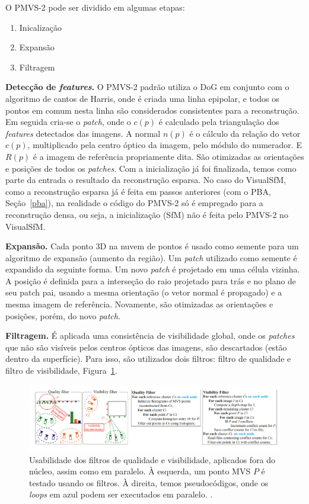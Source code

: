 O PMVS-2 pode ser dividido em algumas etapas:
\begin{enumerate}
\item{Inicalização}
\item{Expansão}
\item{Filtragem}
\end{enumerate}

\noindent\textbf{Detecção de \emph{features}.}
O PMVS-2 padrão utiliza o DoG em conjunto com o algoritmo de cantos de Harris,
onde é criada uma linha epipolar, e todos os pontos em comum nesta linha são
considerados consistentes para a reconstrução.  Em seguida cria-se o
\emph{patch},
onde o $c(p)$ é calculado pela triangulação dos \emph{features} detectados das
imagens. A normal $n(p)$ é o cálculo da relação do vetor $c(p)$, multiplicado
pela centro óptico da imagem, pelo módulo do numerador. E $R(p)$ é a imagem de
referência propriamente dita. São otimizadas as orientações e posições de todos
os \emph{patches}. Com a inicialização já foi finalizada, temos como parte da
entrada o resultado da reconstrução esparsa. No caso do VisualSfM, como a
reconstrução esparsa já é feita em passos anteriores (com o PBA, Seção~\ref{pba}), na
realidade o código do PMVS-2 só é empregado para a reconstrução densa, ou seja, a
inicialização (SfM) não é feita pelo PMVS-2 no VisualSfM.

\noindent\textbf{Expansão.}
Cada ponto 3D na nuvem de pontos é usado como semente para um algoritmo de
expansão (aumento da região). Um \emph{patch} utilizado como semente é expandido
da seguinte forma. Um novo \emph{patch} é projetado em uma célula vizinha.  A
posição é definida para a interseção do raio projetado para trás e no plano de
seu patch pai, usando a mesma orientação (o vetor normal é propagado) e a mesma
imagem de referência.  Novamente, são otimizadas as orientações e posições,
porém, do novo \emph{patch}.	

\noindent\textbf{Filtragem.}
É aplicada uma consistência de visibilidade global, onde os \emph{patches} que
não são visíveis pelos centros ópticos das imagens, são descartados (estão
dentro da superfície). Para isso, são utilizados dois filtros: filtro de
qualidade e filtro de visibilidade, Figura~\ref{fig:filtropmvs}.
\begin{figure}
	\centering
	\includegraphics[width=1\linewidth]{figs/filtropmvs.png}
	\caption{%
  Usabilidade dos filtros de qualidade e visibilidade, aplicados fora
  do núcleo, assim como em paralelo. À esquerda, um ponto MVS $P$ é testado
  usando os filtros. À direita, temos pseudocódigos, onde os \emph{loops}
  em azul podem ser executados em paralelo.
	\protect\cite{furukawa2010towards}.
	}\label{fig:filtropmvs}
\end{figure} 

